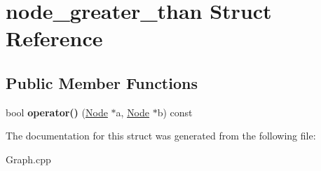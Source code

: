 \hypertarget{structnode__greater__than}{}\section{node\+\_\+greater\+\_\+than Struct Reference}
\label{structnode__greater__than}
\subsection*{Public Member Functions}
\begin{DoxyCompactItemize}
\item 
\hypertarget{structnode__greater__than_ac91d8c047b4c548f2c1ddf95af5a8f6d}{}\label{structnode__greater__than_ac91d8c047b4c548f2c1ddf95af5a8f6d} 
bool {\bfseries operator()} (\hyperlink{class_node}{Node} $\ast$a, \hyperlink{class_node}{Node} $\ast$b) const
\end{DoxyCompactItemize}


The documentation for this struct was generated from the following file\+:\begin{DoxyCompactItemize}
\item 
Graph.\+cpp\end{DoxyCompactItemize}

